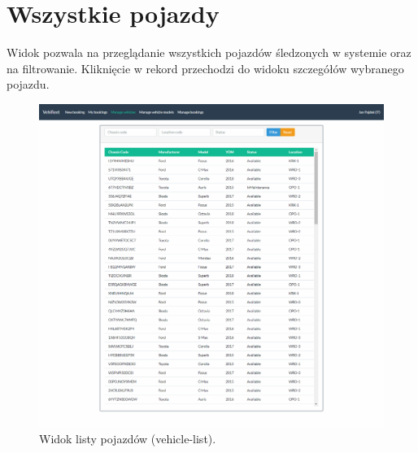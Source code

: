 \documentclass[eng,printmode,openany]{mgr}
\begin{document}
	\section{Wszystkie pojazdy}
	Widok pozwala na przeglądanie wszystkich pojazdów śledzonych w systemie oraz na filtrowanie. Kliknięcie w rekord przechodzi do widoku szczegółów wybranego pojazdu.
	\begin{figure}[H]
		\centering
		\includegraphics[width=\textwidth]{images/views/vehicle-list.png}
		\caption{Widok listy pojazdów (vehicle-list).}
	\end{figure}
	
	\newpage
\end{document}

